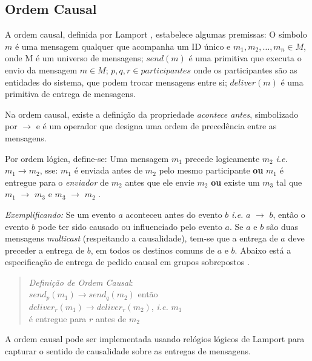 \subsection{Ordem Causal}

A ordem causal, definida por Lamport \cite{lamport1978time}, estabelece algumas premissas: O símbolo $m$ é uma mensagem qualquer que acompanha um ID único e ${m_1, m_2, \dots, m_n} \in M$, onde M é um universo de mensagens; $send(m)$ é uma primitiva que executa o envio da mensagem $m \in M$; $p, q, r \in {participantes}$ onde os participantes são as entidades do sistema, que podem trocar mensagens entre si; $deliver(m)$ é uma primitiva de entrega de mensagens.

Na ordem causal, existe a definição da propriedade \textit{acontece antes}, simbolizado por $\longrightarrow$ e é um operador que designa uma ordem de precedência entre as mensagens.

Por ordem lógica, define-se: Uma mensagem $m_1$ precede logicamente $m_2$ \textit{i.e.} $m_1 \longrightarrow m_2$, sse: $m_1$ é enviada antes de $m_2$ pelo mesmo participante \textbf{ou} $m_1$ é entregue para o \textit{enviador} de $m_2$ antes que ele envie $m_2$ \textbf{ou} existe um $m_3$ tal que $m_1$ $\longrightarrow$ $m_3$ e $m_3$ $\longrightarrow$ $m_2$ \cite{PauloVerissimoLuisRodrigues}.

\textit{Exemplificando:} Se um evento $a$ aconteceu antes do evento $b$ \textit{i.e.} $a$ $\longrightarrow$ $b$, então o evento $b$ pode ter sido causado ou influenciado pelo evento $a$. Se $a$ e $b$ são duas mensagens \textit{multicast} (respeitando a causalidade), tem-se que a entrega de $a$ deve preceder a entrega de $b$, em todos os destinos comuns de $a$ e $b$. Abaixo está a especificação de entrega de pedido causal em grupos sobrepostos \cite{de1995causal}.

\begin{quote}
\textit{Definição de Ordem Causal}:\\
$send_p(m_1) \longrightarrow send_q(m_2)$
então
\\
$deliver_r(m_1) \longrightarrow deliver_r(m_2)$, \textit{i.e.} $m_1$
\\
é entregue para $r$ antes de $m_2$
\end{quote}

A ordem causal pode ser implementada usando relógios lógicos de Lamport \cite{lamport1978time}
para capturar o sentido de causalidade sobre as entregas de mensagens.

